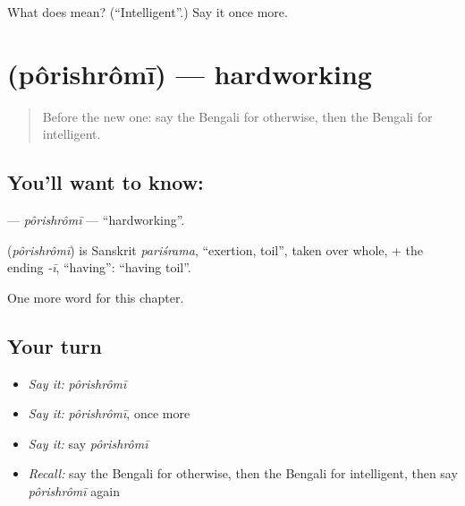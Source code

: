 \begin{tcolorbox}[breakable,colback=teal!4,colframe=teal!35!black,title={Before you move on}]
What does  mean? (\textquotedblleft{}Intelligent\textquotedblright{}.) Say it once more.
\end{tcolorbox}
\section[\texorpdfstring{\bn{পরিশ্রমী} (pôrishrômī)}{পরিশ্রমী (pôrishrômī)}]{ (pôrishrômī) — hardworking}

\label{lesson:BN-C160-porishromi}



\begin{quote}
Before the new one: say the Bengali for otherwise, then the Bengali for intelligent.
\end{quote}

\subsection*{You'll want to know: }
\textbf{} — \emph{pôrishrômī} — \textquotedblleft{}hardworking\textquotedblright{}.

\begin{cousinweb}
\textbf{} (\emph{pôrishrômī}) is Sanskrit \emph{pariśrama}, \textquotedblleft{}exertion, toil\textquotedblright{}, taken over whole, + the ending \emph{-ī}, \textquotedblleft{}having\textquotedblright{}: \textquotedblleft{}having toil\textquotedblright{}.
\end{cousinweb}

\begin{grammarlens}[title={What you've built}]
One more word for this chapter.
\end{grammarlens}

\subsection*{Your turn}
\begin{itemize}
\raggedright
  \item \emph{Say it:} \emph{pôrishrômī}
  \item \emph{Say it:} \emph{pôrishrômī}, once more
  \item \emph{Say it:} say \emph{pôrishrômī}
  \item \emph{Recall:} say the Bengali for otherwise, then the Bengali for intelligent, then say \emph{pôrishrômī} again
\end{itemize}

